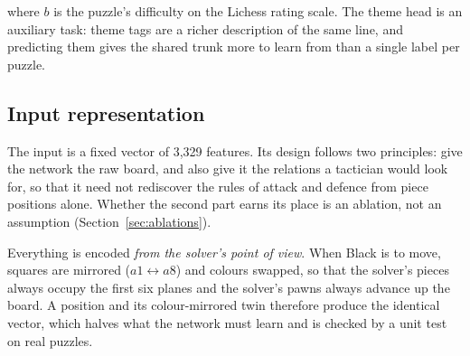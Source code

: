 \noindent where $b$ is the puzzle's difficulty on the Lichess rating scale. The theme head is an
auxiliary task: theme tags are a richer description of the same line, and predicting them gives the
shared trunk more to learn from than a single label per puzzle.

\subsection{Input representation}

The input is a fixed vector of 3{,}329 features. Its design follows two principles: give the network
the raw board, and also give it the relations a tactician would look for, so that it need not
rediscover the rules of attack and defence from piece positions alone. Whether the second part earns
its place is an ablation, not an assumption (Section~\ref{sec:ablations}).

Everything is encoded \emph{from the solver's point of view}. When Black is to move, squares are
mirrored ($a1 \leftrightarrow a8$) and colours swapped, so that the solver's pieces always occupy the
first six planes and the solver's pawns always advance up the board. A position and its
colour-mirrored twin therefore produce the identical vector, which halves what the network must learn
and is checked by a unit test on real puzzles.

